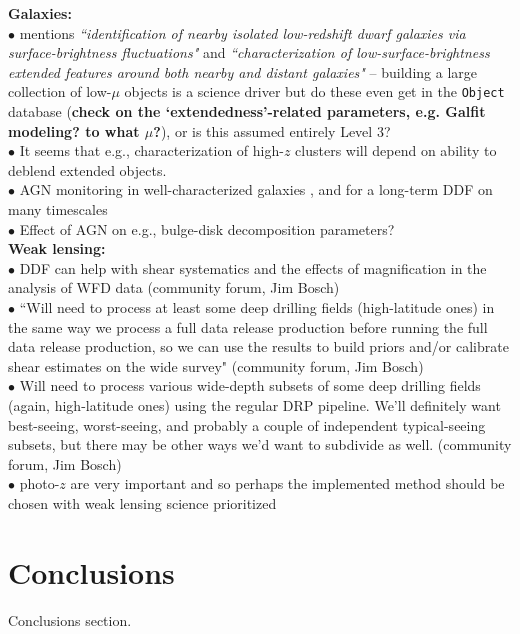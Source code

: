 \documentclass[DM,lsstdraft,toc]{lsstdoc}
\begin{document}
\noindent \textbf{Galaxies:} \\
$\bullet$ \cite{FergusonWP} mentions {\it ``identification of nearby isolated low-redshift dwarf galaxies via surface-brightness fluctuations"} and {\it ``characterization of low-surface-brightness extended features around both nearby and distant galaxies"} -- building a large collection of low-$\mu$ objects is a science driver but do these even get in the {\tt Object} database (\textbf{check on the `extendedness'-related parameters, e.g. {\sc Galfit} modeling? to what $\mu$?}), or is this assumed entirely Level 3? \\
$\bullet$ It seems that e.g., characterization of high-$z$ clusters will depend on ability to deblend extended objects. \\
$\bullet$ AGN monitoring in well-characterized galaxies \citep{FergusonWP}, and for a long-term DDF on many timescales \citep{GawiserWP} \\
$\bullet$ Effect of AGN on e.g., bulge-disk decomposition parameters? \\

\noindent \textbf{Weak lensing:} \\
$\bullet$ DDF can help with shear systematics and the effects of magnification in the analysis of WFD data (community forum, Jim Bosch) \\
$\bullet$ ``Will need to process at least some deep drilling fields (high-latitude ones) in the same way we process a full data release production before running the full data release production, so we can use the results to build priors and/or calibrate shear estimates on the wide survey" (community forum, Jim Bosch) \\
$\bullet$ Will need to process various wide-depth subsets of some deep drilling fields (again, high-latitude ones) using the regular DRP pipeline. We'll definitely want best-seeing, worst-seeing, and probably a couple of independent typical-seeing subsets, but there may be other ways we'd want to subdivide as well. (community forum, Jim Bosch)  \\
$\bullet$ photo-$z$ are very important \citep{MaWP} and so perhaps the implemented method should be chosen with weak lensing science prioritized \\





\section{Conclusions}\label{sec:conc}

Conclusions section.

%


\end{document}
